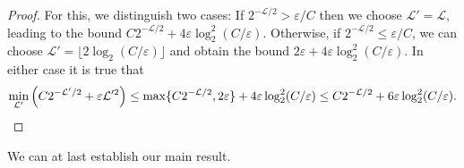 \documentclass[aps,pra,reprint,superscriptaddress,floatfix,amsmath,amssymb,amsfonts]{revtex4-1}
\begin{document}
\begin{proof}
  For this, we distinguish two cases:
  If $2^{-\mathcal L/2}>\varepsilon/C$ then we choose $\mathcal L'=\mathcal L$, leading to the bound $C 2^{-\mathcal L/2} + 4 \varepsilon \log_2^2(C/\varepsilon)$.
  Otherwise, if $2^{-\mathcal L/2}\leq\varepsilon/C$, we can choose $\mathcal L'=\lfloor 2\log_2(C/\varepsilon)\rfloor$ and obtain the bound $2 \varepsilon + 4 \varepsilon \log_2^2(C/\varepsilon)$.
  In either case it is true that
  \[ \min_{\mathcal L'} \left(C 2^{-\mathcal L'/2} + \varepsilon \mathcal L'^2\right)
  \leq \max \{ C 2^{-\mathcal L/2}, 2 \varepsilon \} + 4 \varepsilon \log_2^2(C/\varepsilon)
  \leq C 2^{-\mathcal L/2} + 6 \varepsilon \log_2^2(C/\varepsilon). \qedhere \]
\end{proof}

We can at last establish our main result.
\end{document}
